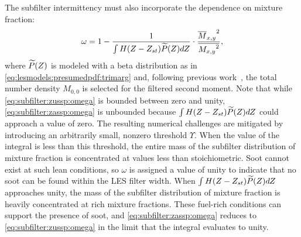 
The subfilter intermittency must also incorporate the dependence on mixture fraction:
\begin{equation}\label{eq:subfilter:zassp:omega}
  \omega = 1 - \frac{1}{\int H(Z - Z_{st})\widetilde{P}(Z) dZ} \cdot \frac{{\overline{M}_{x,y}}^2}{\overline{{M_{x,y}}^2}},
\end{equation}
where $\widetilde{P}(Z)$ is modeled with a beta distribution as in \cref{eq:lesmodels:presumedpdf:trimarg} and, following previous work~\cite{subfilterpdf2011}, the total number density $M_{0,0}$ is selected for the filtered second moment. Note that while \cref{eq:subfilter:zussp:omega} is bounded between zero and unity, \cref{eq:subfilter:zassp:omega} is unbounded because $\int H(Z - Z_{st})\widetilde{P}(Z) dZ$ could approach a value of zero. The resulting numerical challenges are mitigated by introducing an arbitrarily small, nonzero threshold $\Upsilon$. When the value of the integral is less than this threshold, the entire mass of the subfilter distribution of mixture fraction is concentrated at values less than stoichiometric. Soot cannot exist at such lean conditions, so $\omega$ is assigned a value of unity to indicate that no soot can be found within the LES filter width. When $\int H(Z - Z_{st})\widetilde{P}(Z) dZ$ approaches unity, the mass of the subfilter distribution of mixture fraction is heavily concentrated at rich mixture fractions. These fuel-rich conditions can support the presence of soot, and \cref{eq:subfilter:zassp:omega} reduces to \cref{eq:subfilter:zussp:omega} in the limit that the integral evaluates to unity.


